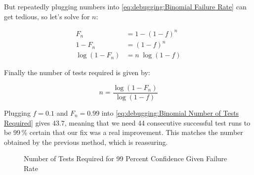 But repeatedly plugging numbers into
\cref{eq:debugging:Binomial Failure Rate}
can get tedious, so let's solve for $n$:

\begin{align}
	F_n & = 1-\left(1-f\right)^n \\
	1 - F_n & = \left(1-f\right)^n \\
	\log \left(1 - F_n\right) & = n \; \log \left(1 - f\right)
\end{align}

Finally the number of tests required is given by:

\begin{equation}
	n = \frac{\log\left(1 - F_n\right)}{\log\left(1 - f\right)}
\label{eq:debugging:Binomial Number of Tests Required}
\end{equation}

Plugging $f=0.1$ and $F_n=0.99$ into
\cref{eq:debugging:Binomial Number of Tests Required}
gives 43.7, meaning that we need 44 consecutive successful test
runs to be 99\,\% certain that our fix was a real improvement.
This matches the number obtained by the previous method, which
is reassuring.

\QuickQuizEnd

\begin{figure}
\centering
{}
\caption{Number of Tests Required for 99 Percent Confidence Given Failure Rate}
\label{fig:debugging:Number of Tests Required for 99 Percent Confidence Given Failure Rate}
\end{figure}

